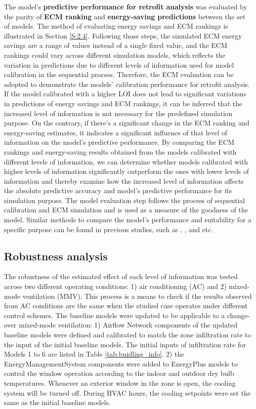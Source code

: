 \documentclass[3p,times,12pt]{elsarticle}
\begin{document}
\begin{sloppypar}
The model's \textbf{predictive performance for retrofit analysis} was evaluated by the parity of \textbf{ECM ranking} and \textbf{energy-saving predictions} between the set of models. The method of evaluating energy savings and ECM rankings is illustrated in Section \ref{S:2.4}. Following those steps, the simulated ECM energy savings are a range of values instead of a single fixed value, and the ECM rankings could vary across different simulation models, which reflects the variation in predictions due to different levels of information used for model calibration in the sequential process. Therefore, the ECM evaluation can be adopted to demonstrate the models' calibration performance for retrofit analysis. If the model calibrated with a higher LOI does not lead to significant variations in predictions of energy savings and ECM rankings, it can be inferred that the increased level of information is not necessary for the predefined simulation purpose. On the contrary, if there's a significant change in the ECM ranking and energy-saving estimates, it indicates a significant influence of that level of information on the model's predictive performance. By comparing the ECM rankings and energy-saving results obtained from the models calibrated with different levels of information, we can determine whether models calibrated with higher levels of information significantly outperform the ones with lower levels of information and thereby examine how the increased level of information affects the absolute predictive accuracy and model's predictive performance for its simulation purpose. The model evaluation step follows the process of sequential calibration and ECM simulation and is used as a measure of the goodness of the model. Similar methods to compare the model's performance and suitability for a specific purpose can be found in previous studies, such as \cite{shamsi2017generalization}, \cite{sun2017framework}, and \cite{heo2012calibration} etc.


\subsection{Robustness analysis}
\label{S:2.6}
The robustness of the estimated effect of each level of information was tested across two different operating conditions: 1) air conditioning (AC) and 2) mixed-mode ventilation (MMV). This process is a means to check if the results observed from AC conditions are the same when the studied case operates under different control schemes. The baseline models were updated to be applicable to a change-over mixed-mode ventilation: 1) Airflow Network components of the updated baseline models were defined and calibrated to match the zone infiltration rate to the input of the initial baseline models. The initial inputs of infiltration rate for Models 1 to 6 are listed in Table \ref{tab:buidling_info}. 2) the EnergyManagementSystem components were added to EnergyPlus models to control the window operation according to the indoor and outdoor dry bulb temperatures. Whenever an exterior window in the zone is open, the cooling system will be turned off. During HVAC hours, the cooling setpoints were set the same as the initial baseline models. 


\end{sloppypar}
\end{document}
